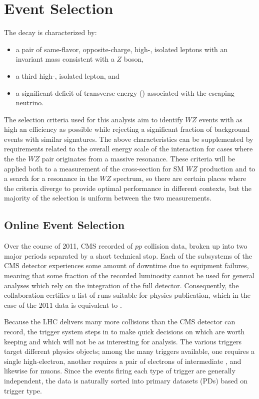 \chapter{Event Selection}
\label{chapter:selection}

The \wztolnll{} decay is characterized by:
\begin{itemize}
\item a pair of same-flavor, opposite-charge, high-\pt, isolated leptons with an invariant mass consistent with a $Z$ boson,
\item a third high-\pt, isolated lepton, and
\item a significant deficit of transverse energy (\MET) associated with the escaping neutrino.
\end{itemize}
The selection criteria used for this analysis aim to identify $WZ$ events with as high an efficiency as possible while rejecting a significant fraction of background events with similar signatures.  The above characteristics can be supplemented by requirements related to the overall energy scale of the interaction for cases where the the $WZ$ pair originates from a massive resonance.  These criteria will be applied both to a measurement of the cross-section for SM $WZ$ production and to a search for a resonance in the $WZ$ spectrum, so there are certain places where the criteria diverge to provide optimal performance in different contexts, but the majority of the selection is uniform between the two measurements.

\section{Online Event Selection}
Over the course of 2011, CMS recorded \recordedlumi{} of $pp$ collision data, broken up into two major periods separated by a short technical stop.  
Each of the subsystems of the CMS detector experiences some amount of downtime due to equipment failures, meaning that some fraction of the recorded luminosity cannot be used for general analyses which rely on the integration of the full detector.  Consequently, the collaboration certifies a list of runs suitable for physics publication, which in the case of the 2011 data is equivalent to \jsonlumi.

Because the LHC delivers many more collisions than the CMS detector can record, the trigger system steps in to make quick decisions on which are worth keeping and which will not be as interesting for analysis.  The various triggers target different physics objects; among the many triggers available, one requires a single high-\pt electron, another requires a pair of electrons of intermediate \pt, and likewise for muons.  Since the events firing each type of trigger are generally independent, the data is naturally sorted into primary datasets (PDs) based on trigger type.

